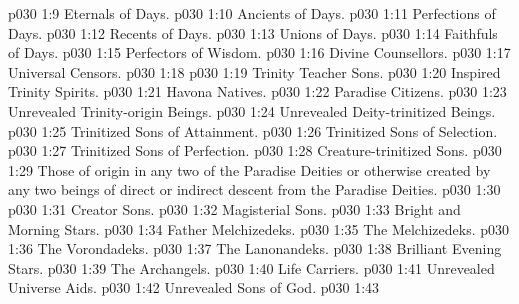 \vs p030 1:9 \bibnobreakspace Eternals of Days.
\vs p030 1:10 \bibnobreakspace Ancients of Days.
\vs p030 1:11 \bibnobreakspace Perfections of Days.
\vs p030 1:12 \bibnobreakspace Recents of Days.
\vs p030 1:13 \bibnobreakspace Unions of Days.
\vs p030 1:14 \bibnobreakspace Faithfuls of Days.
\vs p030 1:15 \bibnobreakspace Perfectors of Wisdom.
\vs p030 1:16 \bibnobreakspace Divine Counsellors.
\vs p030 1:17 \bibnobreakspace Universal Censors.
\vs p030 1:18 \bibnobreakspace {}
\vs p030 1:19 \bibnobreakspace Trinity Teacher Sons.
\vs p030 1:20 \bibnobreakspace Inspired Trinity Spirits.
\vs p030 1:21 \bibnobreakspace Havona Natives.
\vs p030 1:22 \bibnobreakspace Paradise Citizens.
\vs p030 1:23 \bibnobreakspace Unrevealed Trinity\hyp{}origin Beings.
\vs p030 1:24 \bibnobreakspace Unrevealed Deity\hyp{}trinitized Beings.
\vs p030 1:25 \bibnobreakspace Trinitized Sons of Attainment.
\vs p030 1:26 \bibnobreakspace Trinitized Sons of Selection.
\vs p030 1:27 \bibnobreakspace Trinitized Sons of Perfection.
\vs p030 1:28 \bibnobreakspace Creature\hyp{}trinitized Sons.
\vs p030 1:29 \bibnobreakspace {} Those of origin in any two of the Paradise Deities or otherwise created by any two beings of direct or indirect descent from the Paradise Deities.
\vs p030 1:30 \bibnobreakspace {}
\vs p030 1:31 \bibnobreakspace Creator Sons.
\vs p030 1:32 \bibnobreakspace Magisterial Sons.
\vs p030 1:33 \bibnobreakspace Bright and Morning Stars.
\vs p030 1:34 \bibnobreakspace Father Melchizedeks.
\vs p030 1:35 \bibnobreakspace The Melchizedeks.
\vs p030 1:36 \bibnobreakspace The Vorondadeks.
\vs p030 1:37 \bibnobreakspace The Lanonandeks.
\vs p030 1:38 \bibnobreakspace Brilliant Evening Stars.
\vs p030 1:39 \bibnobreakspace The Archangels.
\vs p030 1:40 \bibnobreakspace Life Carriers.
\vs p030 1:41 \bibnobreakspace Unrevealed Universe Aids.
\vs p030 1:42 \bibnobreakspace Unrevealed Sons of God.
\vs p030 1:43 \bibnobreakspace {}
